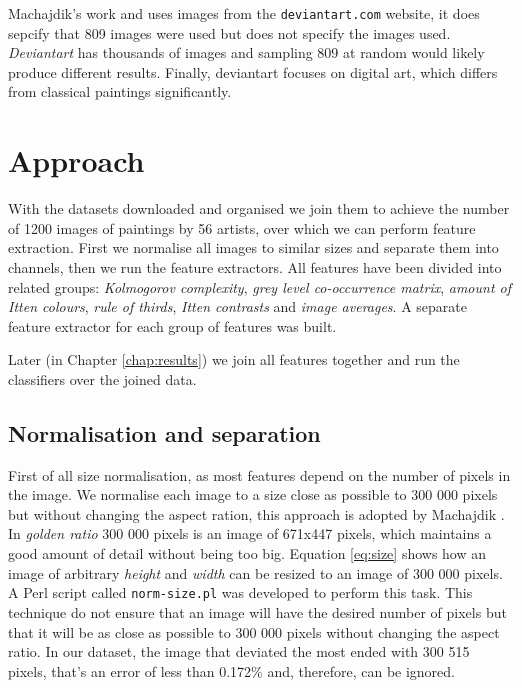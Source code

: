 \documentclass[11pt,a4paper,twoside,openright,draft]{report}
\begin{document}
\begin{multicols}{2}
Machajdik's work \cite{mach10clas} and \cite{mach10ua} uses images from the
\texttt{deviantart.com} website, it does sepcify that 809 images were used but
does not specify the images used.  \emph{Deviantart} has thousands of images
and sampling 809 at random would likely produce different results.  Finally,
deviantart focuses on digital art, which differs from classical paintings
significantly.

\end{multicols}

\chapter{Approach}  %
\label{chap:approach}
\begin{multicols}{2}

With the datasets downloaded and organised we join them to achieve the number
of 1200 images of paintings by 56 artists, over which we can perform feature
extraction.  First we normalise all images to similar sizes and separate them
into channels, then we run the feature extractors.  All features have been
divided into related groups: \emph{Kolmogorov complexity}, \emph{grey level
co-occurrence matrix}, \emph{amount of Itten colours}, \emph{rule of thirds},
\emph{Itten contrasts} and \emph{image averages}.  A separate feature extractor
for each group of features was built.

Later (in Chapter \ref{chap:results}) we join all features together and run the
classifiers over the joined data.

\section{Normalisation and separation}

First of all size normalisation, as most features depend on the number of
pixels in the image.  We normalise each image to a size close as possible to
300 000 pixels but without changing the aspect ration, this approach is adopted
by Machajdik \cite{mach10clas}.  In \emph{golden ratio} 300 000 pixels is an
image of 671x447 pixels, which maintains a good amount of detail without being
too big.  Equation \ref{eq:size} shows how an image of arbitrary \emph{height}
and \emph{width} can be resized to an image of 300 000 pixels.  A Perl script
called \texttt{norm-size.pl} was developed to perform this task.  This
technique do not ensure that an image will have the desired number of pixels
but that it will be as close as possible to 300 000 pixels without changing the
aspect ratio.  In our dataset, the image that deviated the most ended with 300
515 pixels, that's an error of less than 0.172\% and, therefore, can be
ignored.


\end{multicols}
\end{document}
